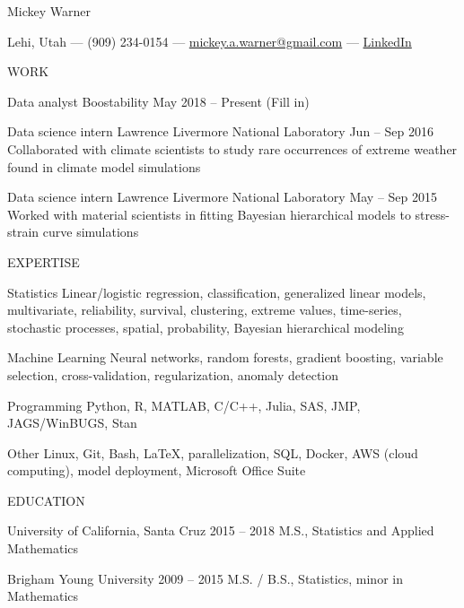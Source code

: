 \documentclass[12pt]{article}
\begin{document}
\begin{center}
Mickey Warner
\smallskip

Lehi, Utah --- (909) 234-0154 --- \href{mailto:mickey.a.warner@gmail.com}{mickey.a.warner@gmail.com} --- \href{https://www.linkedin.com/in/mickey-warner/}{LinkedIn}
\end{center}

\hline

WORK

Data analyst
Boostability
May 2018 -- Present
(Fill in)

Data science intern
Lawrence Livermore National Laboratory
Jun -- Sep 2016
Collaborated with climate scientists to study rare occurrences of extreme weather found in climate model simulations

Data science intern
Lawrence Livermore National Laboratory
May -- Sep 2015
Worked with material scientists in fitting Bayesian hierarchical models to stress-strain curve simulations

\hline

EXPERTISE

Statistics
Linear/logistic regression, classification, generalized linear models, multivariate,
reliability, survival, clustering, extreme values, time-series, stochastic processes,
spatial, probability, Bayesian hierarchical modeling

Machine Learning
Neural networks, random forests, gradient boosting, variable selection, cross-validation, regularization, anomaly detection


Programming
Python, R, MATLAB, C/C++, Julia, SAS, JMP, JAGS/WinBUGS, Stan

Other
Linux, Git, Bash, LaTeX, parallelization, SQL,
Docker, AWS (cloud computing), model deployment,
Microsoft Office Suite

\hline

EDUCATION

University of California, Santa Cruz
2015 -- 2018
M.S., Statistics and Applied Mathematics

Brigham Young University
2009 -- 2015
M.S. / B.S., Statistics, minor in Mathematics
\end{document}
